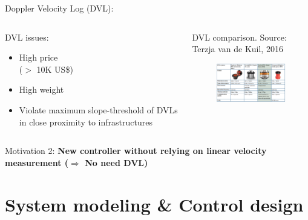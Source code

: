 \documentclass{beamer}
\begin{document}
\begin{frame}{Doppler Velocity Log (DVL):}
	\vspace{-0.5cm}
	\begin{columns}[t]
		\begin{block}{DVL issues:}
			\small
			\begin{itemize}
				\item High price \\($>$ 10K US\$)
				\item High weight
				\item Violate maximum slope-threshold of DVLs in close proximity to infrastructures
			\end{itemize}
		\end{block}
		\begin{block}{{\small DVL comparison.} \tiny Source: Terzja van de Kuil, 2016}
			\begin{figure}
				\includegraphics[width = 70mm]{Images/DVL_prices.png}\\ \vspace{0.2cm}
				{\color{blue}}
			\end{figure}
		\end{block}		
		
	\end{columns} 
\begin{exampleblock}{Motivation 2:}
	\centering
	{\color{red} \textbf{New controller without relying on linear velocity measurement ($\Rightarrow$ No need DVL)}}
\end{exampleblock}

\end{frame}

\section{System modeling \& Control design}
\end{document}
